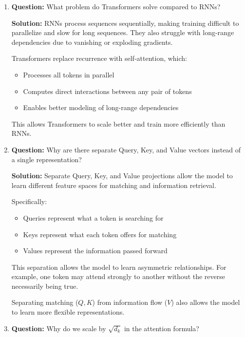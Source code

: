 \documentclass[11pt]{article}
\begin{document}
\begin{enumerate}

\item \textbf{Question:} What problem do Transformers solve compared to RNNs?

\textbf{Solution:}
RNNs process sequences sequentially, making training difficult to parallelize and slow for long sequences. They also struggle with long-range dependencies due to vanishing or exploding gradients.

Transformers replace recurrence with self-attention, which:

\begin{itemize}[nosep]

\item Processes all tokens in parallel
\item Computes direct interactions between any pair of tokens
\item Enables better modeling of long-range dependencies

\end{itemize}

This allows Transformers to scale better and train more efficiently than RNNs.

\item \textbf{Question:} Why are there separate Query, Key, and Value vectors instead of a single representation?

\textbf{Solution:}
Separate Query, Key, and Value projections allow the model to learn different feature spaces for matching and information retrieval.

Specifically:

\begin{itemize}[nosep]

\item Queries represent what a token is searching for
\item Keys represent what each token offers for matching
\item Values represent the information passed forward

\end{itemize}

This separation allows the model to learn asymmetric relationships. For example, one token may attend strongly to another without the reverse necessarily being true.

Separating matching ($Q,K$) from information flow ($V$) also allows the model to learn more flexible representations.

\item \textbf{Question:} Why do we scale by $\sqrt{d_k}$ in the attention formula?


\end{enumerate}
\end{document}
